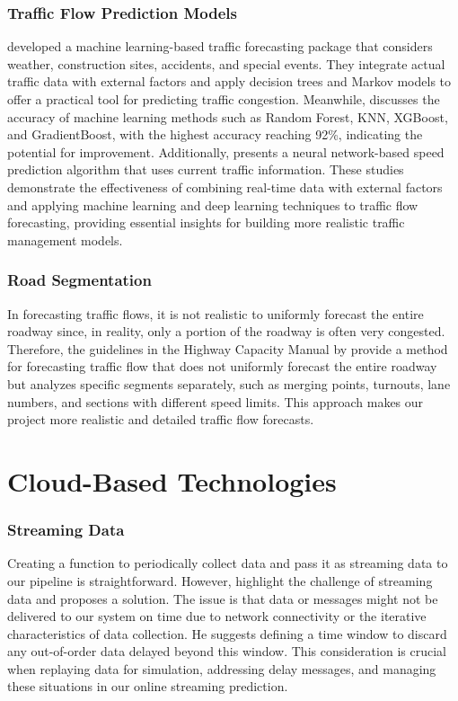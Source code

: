 \subsubsection{Traffic Flow Prediction Models}
\citet{garrett2020integrated} developed a machine learning-based traffic forecasting package that considers weather, construction sites, accidents, and special events. They integrate actual traffic data with external factors and apply decision trees and Markov models to offer a practical tool for predicting traffic congestion. Meanwhile, \citet{zafar2020traffic} discusses the accuracy of machine learning methods such as Random Forest, KNN, XGBoost, and GradientBoost, with the highest accuracy reaching 92\%, indicating the potential for improvement. Additionally, \citet{park2011real} presents a neural network-based speed prediction algorithm that uses current traffic information. These studies demonstrate the effectiveness of combining real-time data with external factors and applying machine learning and deep learning techniques to traffic flow forecasting, providing essential insights for building more realistic traffic management models.

\subsubsection{Road Segmentation}
In forecasting traffic flows, it is not realistic to uniformly forecast the entire roadway since, in reality, only a portion of the roadway is often very congested. Therefore, the guidelines in the Highway Capacity Manual by \citet{bob2023freeway} provide a method for forecasting traffic flow that does not uniformly forecast the entire roadway but analyzes specific segments separately, such as merging points, turnouts, lane numbers, and sections with different speed limits. This approach makes our project more realistic and detailed traffic flow forecasts.

\section{Cloud-Based Technologies}
\subsubsection{Streaming Data}
Creating a function to periodically collect data and pass it as streaming data to our pipeline is straightforward. However, \citet{damji2020learning} highlight the challenge of streaming data and proposes a solution. The issue is that data or messages might not be delivered to our system on time due to network connectivity or the iterative characteristics of data collection. He suggests defining a time window to discard any out-of-order data delayed beyond this window. This consideration is crucial when replaying data for simulation, addressing delay messages, and managing these situations in our online streaming prediction.

